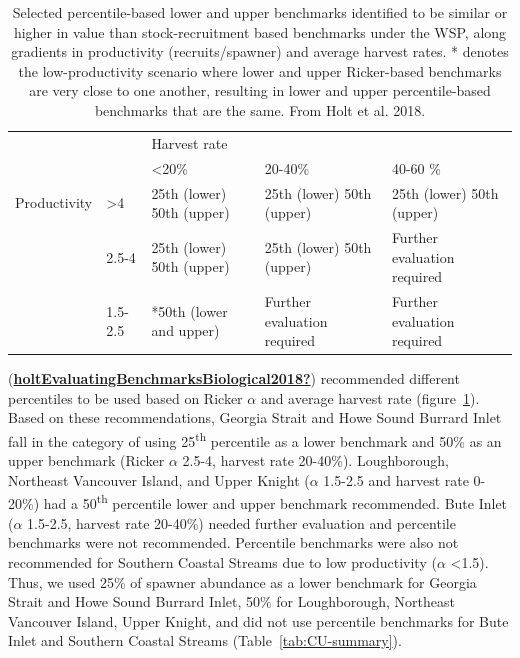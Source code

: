 \documentclass[11pt]{book}
\begin{document}
\renewcommand*{\arraystretch}{1.5}
\begin{table}[ht]
\centering
\caption{Selected percentile-based lower and upper benchmarks identified to be similar or higher in value than stock-recruitment based benchmarks under the WSP, along gradients in productivity (recruits/spawner) and average harvest rates. * denotes the low-productivity scenario where lower and upper Ricker-based benchmarks are very close to one another, resulting in lower and upper percentile-based benchmarks that are the same. From Holt et al. 2018.}
\begin{tabular}{l l p{2.5cm} p{2.5cm} p{2.5cm}}
\hline       &     & \multicolumn{3}{l}{Harvest rate}\\ 
& & <20\% & 20-40\% & 40-60 \% \\
\hline
Productivity& >4 & 25th (lower)  50th (upper) & 25th (lower) 50th (upper) & 25th (lower) 50th (upper) \\
& 2.5-4 & 25th (lower) 50th (upper) & 25th (lower) 50th (upper) & Further evaluation required \\
& 1.5-2.5 & *50th (lower and upper) & Further evaluation required & Further evaluation required \\               
\hline
\end{tabular}
\label{tab:holt-tab6}
\end{table}
(\protect\hyperlink{ref-holtEvaluatingBenchmarksBiological2018}{\textbf{holtEvaluatingBenchmarksBiological2018?}}) recommended different percentiles to be used based on Ricker \(\alpha\) and average harvest rate (figure~\ref{tab:holt-tab6}). Based on these recommendations, Georgia Strait and Howe Sound Burrard Inlet fall in the category of using 25\textsuperscript{th} percentile as a lower benchmark and 50\% as an upper benchmark (Ricker \(\alpha\) 2.5-4, harvest rate 20-40\%). Loughborough, Northeast Vancouver Island, and Upper Knight (\(\alpha\) 1.5-2.5 and harvest rate 0-20\%) had a 50\textsuperscript{th} percentile lower and upper benchmark recommended. Bute Inlet (\(\alpha\) 1.5-2.5, harvest rate 20-40\%) needed further evaluation and percentile benchmarks were not recommended. Percentile benchmarks were also not recommended for Southern Coastal Streams due to low productivity (\(\alpha\) \textless1.5). Thus, we used 25\% of spawner abundance as a lower benchmark for Georgia Strait and Howe Sound Burrard Inlet, 50\% for Loughborough, Northeast Vancouver Island, Upper Knight, and did not use percentile benchmarks for Bute Inlet and Southern Coastal Streams (Table~\ref{tab:CU-summary}).
\end{document}

